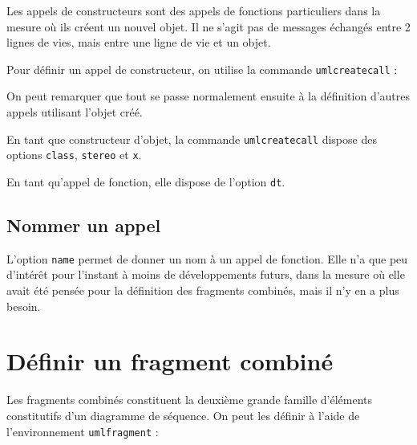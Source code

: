 \documentclass[a4paper,11pt]{report}
\newcommand{\inputTikZ}[1]{%
  }%
\newcommand{\inputTikZ}[1]{%
    \texttt{[image: fig/\#1.pdf]}%
  }%
\begin{document}
Les appels de constructeurs sont des appels de fonctions particuliers dans la mesure où ils créent un nouvel objet. Il ne s'agit pas de messages échangés entre 2 lignes de vies, mais entre une ligne de vie et un objet.

Pour définir un appel de constructeur, on utilise la commande {\tt umlcreatecall} :

\medskip

\begin{minipage}{0.5\textwidth}

\end{minipage}
\begin{minipage}{0.5\textwidth}
\begin{center}
\inputTikZ{createcall}
\end{center}
\end{minipage}

\medskip

On peut remarquer que tout se passe normalement ensuite à la définition d'autres appels utilisant l'objet créé.

\medskip

En tant que constructeur d'objet, la commande {\tt umlcreatecall} dispose des options {\tt class}, {\tt stereo} et {\tt x}.

En tant qu'appel de fonction, elle dispose de l'option {\tt dt}.

\subsection{Nommer un appel}\label{ss.callname}

L'option {\tt name} permet de donner un nom à un appel de fonction. Elle n'a que peu d'intérêt pour l'instant à moins de développements futurs, dans la mesure où elle avait été pensée pour la définition des fragments combinés, mais il n'y en a plus besoin.

\section{Définir un fragment combiné}\label{s.fragments}

Les fragments combinés constituent la deuxième grande famille d'éléments constitutifs d'un diagramme de séquence. On peut les définir à l'aide de l'environnement {\tt umlfragment} :

\medskip

\begin{minipage}{0.5\textwidth}

\end{minipage}
\begin{minipage}{0.5\textwidth}
\begin{center}
\inputTikZ{fragment}
\end{center}
\end{minipage}
\end{document}
